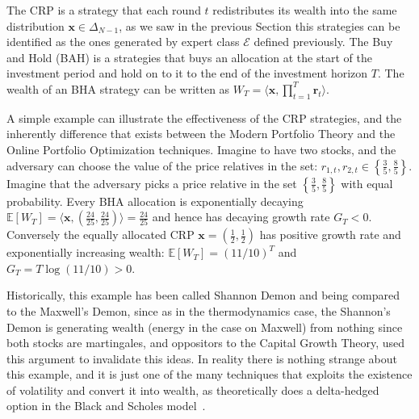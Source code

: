 The CRP is a strategy that each round $t$ redistributes its wealth into the same distribution $\mathbf x\in\Delta_{N-1}$, as we saw in the previous Section this strategies can be identified as the ones generated by expert class $\mathcal E$ defined previously.
The Buy and Hold (BAH) is a strategies that buys an allocation at the start of the investment period and hold on to it to the end of the investment horizon $T$. The wealth of an BHA strategy can be written as $W_T=\langle\mathbf x, \prod_{t=1}^T \mathbf r_t\rangle$.

A simple example can illustrate the effectiveness of the CRP strategies, and the inherently difference that exists between the Modern Portfolio Theory and the Online Portfolio Optimization techniques.
Imagine to have two stocks, and the adversary can choose the value of the price relatives in the set: $r_{1,t},r_{2,t}\in\left\{\frac{3}{5},\frac{8}{5}\right\}$. Imagine that the adversary picks a price relative in the set $\left\{\frac{3}{5},\frac{8}{5}\right\}$ with equal probability. Every BHA allocation is exponentially decaying $\mathbb E[W_T]=\langle \mathbf x, (\frac{24}{25},\frac{24}{25})\rangle=\frac{24}{25}$ and hence has decaying growth rate $G_T<0$. Conversely the equally allocated CRP $\mathbf x=(\frac{1}{2},\frac{1}{2})$ has positive growth rate and exponentially increasing wealth: $\mathbb E[W_T]=(11/10)^T$ and $G_T=T\log(11/10)>0$.

Historically, this example has been called Shannon Demon \cite{poundstone2010fortune} and being compared to the Maxwell's Demon, since as in the thermodynamics case, the Shannon's Demon is generating wealth (energy in the case on Maxwell) from nothing since both stocks are martingales, and oppositors to the Capital Growth Theory, used this argument to invalidate this ideas. In reality there is nothing strange about this example, and it is just one of the many techniques that exploits the existence of volatility and convert it into wealth, as theoretically does a delta-hedged option in the Black and Scholes model~\cite{black1973pricing}.
